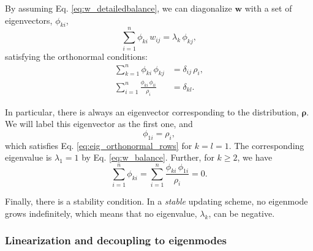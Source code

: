 \documentclass[reprint, superscriptaddress, floatfix]{revtex4-1}
\begin{document}
By assuming Eq. \eqref{eq:w_detailedbalance},
we can diagonalize $\mathbf w$ with a set of
eigenvectors, $\phi_{ki}$,
%
\begin{equation}
  \sum_{i = 1}^n \phi_{ki} \, w_{ij}
  =
  \lambda_k \, \phi_{kj}
  ,
\label{eq:eig_w}
\end{equation}
%
satisfying the orthonormal conditions\cite{vankampen}:
%
\begin{align}
  \sum_{k = 1}^n
    \phi_{ki} \, \phi_{kj}
  &=
  \delta_{ij} \, \rho_i,
  \label{eq:eig_orthonormal_cols}
  \\
  \sum_{i = 1}^n
    \frac{ \phi_{ki} \, \phi_{li} }
         { \rho_i }
  &=
  \delta_{kl}
  .
\label{eq:eig_orthonormal_rows}
\end{align}

In particular, there is always an eigenvector
corresponding to the distribution, $\pmb \rho$.
%
We will label this eigenvector as the first one,
and
%
\begin{equation}
  \phi_{1i} = \rho_i,
\label{eq:eigenmode1}
\end{equation}
%
which satisfies Eq. \eqref{eq:eig_orthonormal_rows}
for $k = l = 1$.
%
The corresponding eigenvalue is $\lambda_1 = 1$
by Eq. \eqref{eq:w_balance}.
%
Further, for $k \ge 2$, we have
%
\begin{equation}
  \sum_{ i = 1 }^n \phi_{ki}
  =
  \sum_{ i = 1 }^n
    \frac{ \phi_{ki} \, \phi_{1i} }
         { \rho_i }
  =
  0
  .
\label{eq:ortho1}
\end{equation}

Finally, there is a stability condition.
%
In a \emph{stable} updating scheme,
no eigenmode grows indefinitely,
which means that no eigenvalue, $\lambda_k$,
can be negative.




\subsubsection{Linearization and decoupling to eigenmodes}
\end{document}
